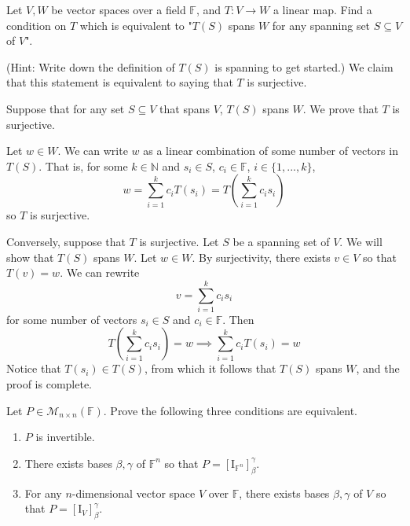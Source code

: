 \documentclass{eh-homework}
\begin{document}
    \begin{question}{7}
        Let \( V, W \) be vector spaces over a field \( \mathbb{F} \), and \( T : V \to W \) a linear map. Find a condition on \( T \) which is equivalent to "\( T(S) \) spans \( W \) for any spanning set \( S \subseteq V \) of \( V \)".

        (Hint: Write down the definition of \( T(S) \) is spanning to get started.)
        \tcblower
        We claim that this statement is equivalent to saying that \(T\) is surjective.

        Suppose that for any set \(S \subseteq V\) that spans \(V\), \(T(S)\) spans \(W\). We prove that \(T\) is surjective.

        Let \(w \in W\). We can write \(w\) as a linear combination of some number of vectors in \(T(S)\). That is, for some \(k \in \mathbb{N}\) and \(s_i \in S\), \(c_i \in \mathbb{F}\), \(i \in \{ 1, ..., k \}\),
        \[
            w = \sum_{i=1}^{k} c_i T(s_i) = T \left(\sum_{i=1}^{k}c_i s_i\right)
        \]
        so \(T\) is surjective.

        Conversely, suppose that \(T\) is surjective. Let \(S\) be a spanning set of \(V\). We will show that \(T(S)\) spans \(W\). Let \(w \in W\). By surjectivity, there exists \(v \in V\) so that \(T(v) = w\). We can rewrite
        \[
            v = \sum_{i=1}^{k} c_i s_i
        \]
        for some number of vectors \(s_i \in S\) and \(c_i \in \mathbb{F}\). Then
        \[
            T\left( \sum_{i=1}^{k} c_i s_i \right) = w \implies \sum_{i=1}^{k} c_i T(s_i) = w
        \]
        Notice that \(T(s_i) \in T(S)\), from which it follows that \(T(S)\) spans \(W\), and the proof is complete.
    \end{question}

    \begin{question}{8}
        Let \( P \in \mathcal{M}_{n \times n}(\mathbb{F}) \). Prove the following three conditions are equivalent.

        \begin{enumerate}
            \item \( P \) is invertible.
            \item There exists bases \( \beta, \gamma \) of \( \mathbb{F}^n \) so that \( P = [\mathrm{I}_{\mathbb{F}^n}]_\beta^\gamma \).
            \item For any \( n \)-dimensional vector space \( V \) over \( \mathbb{F} \), there exists bases \( \beta, \gamma \) of \( V \) so that \( P = [\mathrm{I}_V]_\beta^\gamma \).
        \end{enumerate}
    \end{question}
\end{document}
